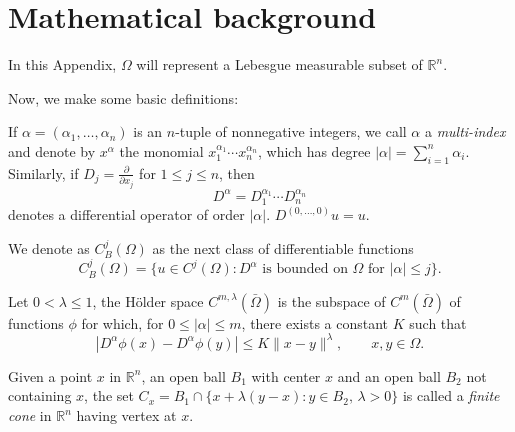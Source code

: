 
\chapter{Mathematical background} %
\label{chap:AppendixB} %
In this Appendix, $\Omega$ will represent a Lebesgue measurable subset of $\mathbb{R}^n$.

Now, we make some basic definitions:
\begin{definition}If $\alpha=(\alpha_1,\ldots,\alpha_n)$ is an $n$-tuple of nonnegative integers, we call $\alpha$ a \emph{multi-index} and denote by $x^\alpha$ the monomial $x_1^{\alpha_1}\cdots x_n^{\alpha_n}$, which has degree $|\alpha|=\sum_{i=1}^n \alpha_i$. Similarly, if $D_j=\frac{\partial}{\partial x_j}$ for $1\leq j\leq n$, then
$$D^\alpha=D_1^{\alpha_1}\cdots D_n^{\alpha_n}$$ denotes a differential operator of order $|\alpha|$. $D^{(0,\ldots,0)}u=u$.
\end{definition}
\begin{definition}
We denote as $C_B^j(\Omega)$ as the next class of differentiable functions $$C_B^j(\Omega)=\{u\in C^j(\Omega):D^\alpha\text{ is bounded on }\Omega\text{ for } |\alpha|\leq j\}.$$
\end{definition}
\begin{definition}
Let $0<\lambda \leq 1$, the Hölder space $C^{m,\lambda}(\bar{\Omega})$ is the subspace of $C^m(\bar{\Omega})$ of functions $\phi$ for which, for $0\leq |\alpha|\leq m$, there exists a constant $K$ such that $$|D^\alpha \phi(x) -D^\alpha \phi(y)|\leq K \|x-y\|^\lambda,\qquad x,y \in \Omega.$$
\end{definition}
\begin{definition}
Given a point $x$ in $\mathbb{R}^n$, an open ball $B_1$ with center $x$ and an open ball $B_2$ not containing $x$, the set $C_x=B_1\cap \{x+\lambda(y-x):y\in B_2,\,\lambda >0\}$ is called a \emph{finite cone} in $\mathbb{R}^n$ having vertex at $x$.
\end{definition}

